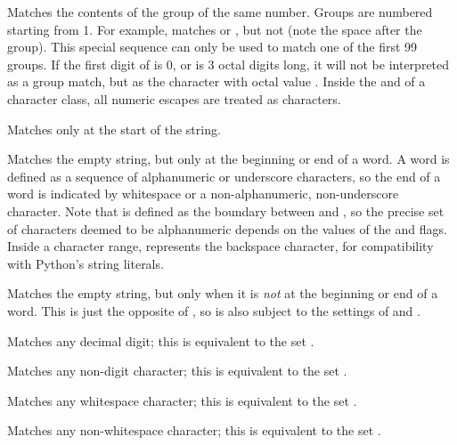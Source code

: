 \begin{list}{}{\leftmargin 0.7in }

\item[\code{\e \var{number}}] Matches the contents of the group of the
same number.  Groups are numbered starting from 1.  For example,
 matches  or , but not
 (note
the space after the group).  This special sequence can only be used to
match one of the first 99 groups.  If the first digit of 
is 0, or  is 3 octal digits long, it will not be interpreted
as a group match, but as the character with octal value .
Inside the \character{[} and \character{]} of a character class, all numeric
escapes are treated as characters.

\item[\code{\e A}] Matches only at the start of the string.

\item[\code{\e b}] Matches the empty string, but only at the
beginning or end of a word.  A word is defined as a sequence of
alphanumeric or underscore characters, so the end of a word is indicated by
whitespace or a non-alphanumeric, non-underscore character.  Note that 
{} is defined as the boundary between  and , so the precise set of characters deemed to be alphanumeric depends on the
values of the  and  flags.  Inside a character
range,  represents the backspace character, for compatibility
with Python's string literals.

\item[\code{\e B}] Matches the empty string, but only when it is \emph{not}
at the beginning or end of a word.  This is just the opposite of {}, so is also subject to the settings of  and .

\item[\code{\e d}]Matches any decimal digit; this is
equivalent to the set \regexp{[0-9]}.

\item[\code{\e D}]Matches any non-digit character; this is
equivalent to the set \regexp{[{\textasciicircum}0-9]}.

\item[\code{\e s}]Matches any whitespace character; this is
equivalent to the set \regexp{[ \e t\e n\e r\e f\e v]}.

\item[\code{\e S}]Matches any non-whitespace character; this is
equivalent to the set \regexp{[\textasciicircum\ \e t\e n\e r\e f\e v]}.


\end{list}
